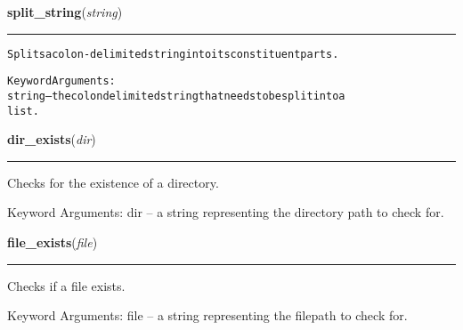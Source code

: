    \vspace{0.5ex}

\hspace{.8\funcindent}\begin{boxedminipage}{\funcwidth}

    \raggedright \textbf{split\_string}(\textit{string})

    \vspace{-1.5ex}

    \rule{\textwidth}{0.5\fboxrule}
\setlength{\parskip}{2ex}
\begin{alltt}
Splits a colon-delimited string into its constituent parts.

Keyword Arguments:
string -- the colon delimited string that needs to be split into a
          list.
\end{alltt}

\setlength{\parskip}{1ex}
    \end{boxedminipage}

    \label{reliafree:utilities:dir_exists}

    \vspace{0.5ex}

\hspace{.8\funcindent}\begin{boxedminipage}{\funcwidth}

    \raggedright \textbf{dir\_exists}(\textit{dir})

    \vspace{-1.5ex}

    \rule{\textwidth}{0.5\fboxrule}
\setlength{\parskip}{2ex}
    Checks for the existence of a directory.

    Keyword Arguments: dir -- a string representing the directory path to 
    check for.

\setlength{\parskip}{1ex}
    \end{boxedminipage}

    \label{reliafree:utilities:file_exists}

    \vspace{0.5ex}

\hspace{.8\funcindent}\begin{boxedminipage}{\funcwidth}

    \raggedright \textbf{file\_exists}(\textit{file})

    \vspace{-1.5ex}

    \rule{\textwidth}{0.5\fboxrule}
\setlength{\parskip}{2ex}
    Checks if a file exists.

    Keyword Arguments: file -- a string representing the filepath to check 
    for.

\setlength{\parskip}{1ex}
    \end{boxedminipage}

